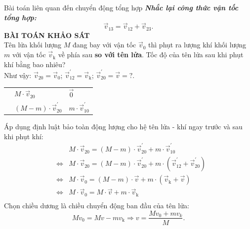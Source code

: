 \begin{dang}{Bài toán liên quan đến chuyển động tổng hợp}
	\textbf{\textit{Nhắc lại công thức vận tốc tổng hợp:}}
	$$\vec{v}_{13}=\vec{v}_{12}+\vec{v}_{23}.$$
	\textbf{BÀI TOÁN KHẢO SÁT}\\
	Tên lửa khối lượng $M$ đang bay với vận tốc $\vec{v}_0$ thì phụt ra lượng khí khối lượng $m$ với vận tốc $\vec{v}_{\mathrm{k}}$ về phía sau \textbf{so với tên lửa}. Tốc độ của tên lửa sau khi phụt khí bằng bao nhiêu?\\
	Như vậy: $\vec{v}_{20}=\vec{v}_0$; $\vec{v}^\prime_{12}=\vec{v}_{\mathrm{k}}$; $\vec{v}^\prime_{20}=\vec{v}=?$.
	\begin{center}
		\begin{tabular}{|M{5cm}|M{5cm}|M{5cm}|}
			\hline
			&& \\
			\hline
			 & $M\cdot\vec{v}_{20}$& $\vec{0}$\\
			\hline
			 & $\left(M-m\right)\cdot\vec{v}^\prime_{20}$& $m\cdot\vec{v}^\prime_{10}$\\
			\hline
		\end{tabular}
	\end{center}
	Áp dụng định luật bảo toàn động lượng cho hệ tên lửa - khí ngay trước và sau khi phụt khí:
	\begin{eqnarray*}
		&&M\cdot\vec{v}_{20}=\left(M-m\right)\cdot\vec{v}^\prime_{20}+m\cdot\vec{v}^\prime_{10}\\
		&\Leftrightarrow&M\cdot\vec{v}_{20}=\left(M-m\right)\cdot\vec{v}^\prime_{20}+m\cdot\left(\vec{v}^\prime_{12}+\vec{v}^\prime_{20}\right)\\
		&\Leftrightarrow&M\cdot\vec{v}_{0}=\left(M-m\right)\cdot\vec{v}+m\cdot\left(\vec{v}_{\mathrm{k}}+\vec{v}\right)\\
		&\Leftrightarrow&M\cdot\vec{v}_{0}=M\cdot\vec{v}+m\cdot\vec{v}_{\mathrm{k}}\\
	\end{eqnarray*}
	Chọn chiều dương là chiều chuyển động ban đầu của tên lửa:
	$$Mv_0=Mv-mv_{\mathrm{k}}\Rightarrow v=\dfrac{Mv_0+mv_k}{M}.$$
\end{dang}
